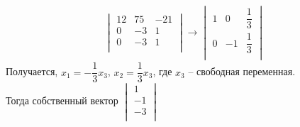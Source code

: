 \begin{enumerate}
\begin{enumerate}
\begin{gather*}
\begin{vmatrix}
						12 & 75 & -21\\ 
						0 & -3 & 1\\
						0 & -3 & 1\\
					\end{vmatrix}
					\to
					\begin{vmatrix}
						1 & 0 & \dfrac{1}{3}\\ 
						0 & -1 & \dfrac{1}{3}\\
					\end{vmatrix}
				\end{gather*}
				Получается, $x_{1} = -\dfrac{1}{3} x_{3}$, $x_{2} = \dfrac{1}{3} x_{3}$, где $x_{3}$ -- свободная переменная.\\
				Тогда собственный вектор $\begin{vmatrix} 1\\ -1\\ -3\\ \end{vmatrix}$ 
				

\end{enumerate}
\end{enumerate}
